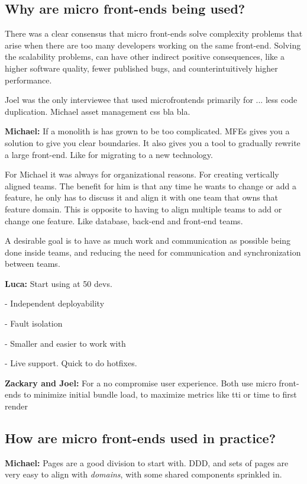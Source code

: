 \subsection{Why are micro front-ends being used?}

There was a clear consensus that micro front-ends solve complexity problems that arise when there are too many developers working on the same front-end. Solving the scalability problems, can have other indirect positive consequences, like a higher software quality, fewer published bugs, and counterintuitively higher performance. 

Joel was the only interviewee that used microfrontends primarily for ... less code duplication. Michael asset management css bla bla.

\textbf{Michael:} If a monolith is has grown to be too complicated. MFEs gives you a solution to give you clear boundaries. It also gives you a tool to gradually rewrite a large front-end. Like for migrating to a new technology.

For Michael it was always for organizational reasons. For creating vertically aligned teams. The benefit for him is that any time he wants to change or add a feature, he only has to discuss it and align it with one team that owns that feature domain. This is opposite to having to align multiple teams to add or change one feature. Like database, back-end and front-end teams.

A desirable goal is to have as much work and communication as possible being done inside teams, and reducing the need for communication and synchronization between teams.

\textbf{Luca:} Start using at 50 devs.

- Independent deployability

- Fault isolation

- Smaller and easier to work with

- Live support. Quick to do hotfixes.

\textbf{Zackary and Joel:} For a no compromise user experience. Both use micro front-ends to minimize initial bundle load, to maximize metrics like tti or time to first render


\subsection{How are micro front-ends used in practice?}

\textbf{Michael:} Pages are a good division to start with. DDD, and sets of pages are very easy to align with \textit{domains}, with some shared components sprinkled in.

